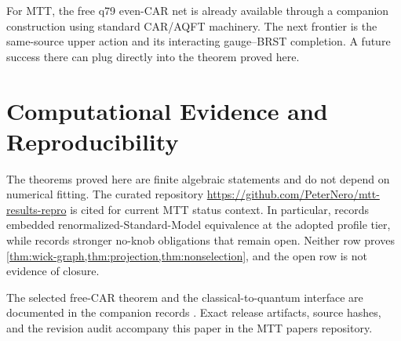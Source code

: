 \documentclass[11pt,a4paper]{article}
\begin{document}
For MTT, the free q79 even-CAR net is already available through a companion
construction using standard CAR/AQFT machinery.  The next frontier is the
same-source upper action and its interacting gauge--BRST completion.  A
future success there can plug directly into the theorem proved here.

\section*{Computational Evidence and Reproducibility}
The theorems proved here are finite algebraic statements and do not depend
on numerical fitting.  The curated repository
\url{https://github.com/PeterNero/mtt-results-repro} is cited for current
MTT status context.  In particular,
 records embedded
renormalized-Standard-Model equivalence at the adopted profile tier, while
 records stronger no-knob obligations
that remain open.  Neither row proves
\cref{thm:wick-graph,thm:projection,thm:nonselection}, and the open row is
not evidence of closure.

The selected free-CAR theorem and the classical-to-quantum interface are
documented in the companion records
\cite{MTTQFT2026,MTTBasinQFT2026}.  Exact release artifacts, source hashes,
and the revision audit accompany this paper in the MTT papers repository.



\end{document}
